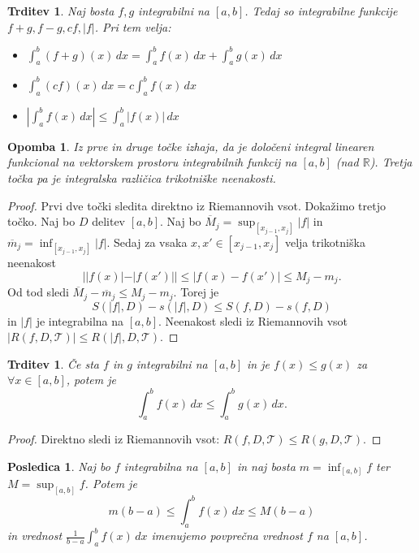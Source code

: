 \documentclass[10pt, a4paper]{article}
\newtheorem{posledica}[izr]{Posledica}
\newtheorem{trditev}[izr]{Trditev}
\newtheorem*{opomba}{Opomba}
\newenvironment{noticeC}{%
  \tcolorbox[%
  notitle,
  empty,
  enhanced,  %
  breakable,
  coltext=black, 
  fontupper=\rmfamily,
  noparskip,
  sharp corners,
  boxrule=-1pt,  %
  frame hidden,
  left=7pt,  %
  right=7pt,
  top=5pt,
  bottom=5pt,
  before skip=2.5ex plus 2pt,
  after skip=2.5ex plus 2pt,
  overlay unbroken and last={%
  },
  ]}
{\endtcolorbox}
\newenvironment{dokaz}%
  {\begin{noticeC}\begin{proof}}%
  {\end{proof}\end{noticeC}}
\newcommand{\R}{\mathbb {R}}
\begin{document}
\begin{trditev}
    Naj bosta $f, g$ integrabilni na $[a, b]$. Tedaj so integrabilne funkcije $f+g, f-g, c f, |f|$.
    Pri tem velja:
    \begin{itemize}
        \item $\int_a ^b (f + g)(x)\,dx = \int_a ^b f(x)\,dx + \int_a ^b g(x)\,dx$
        \item $\int_a ^b (cf)(x)\,dx = c\int_a ^b f(x)\,dx$
        \item $\left|\int_a ^b f(x)\,dx\right| \leq \int_a ^b |f(x)|\,dx$
    \end{itemize}
\end{trditev}

\begin{opomba}
    Iz prve in druge točke izhaja, da je določeni integral linearen funkcional na vektorskem prostoru integrabilnih funkcij na $[a, b]$ (nad $\R$).
    Tretja točka pa je integralska različica trikotniške neenakosti.
\end{opomba}

\begin{dokaz}
    Prvi dve točki sledita direktno iz Riemannovih vsot. Dokažimo tretjo točko.
    Naj bo $D$ delitev $[a, b]$. Naj bo $\overline{M}_j = \sup_{[x_{j-1}, x_{j}]} |f|$ in $\overline{m}_j = \inf_{[x_{j-1}, x_{j}]} |f|$.
    Sedaj za vsaka $x, x' \in [x_{j-1}, x_j]$ velja trikotniška neenakost
    $$||f(x)| - |f(x')|| \leq |f(x) - f(x')| \leq M_j - m_j.$$
    Od tod sledi $\overline{M}_j - \overline{m}_j \leq M_j - m_j$.
    Torej je $$S(|f|, D) - s(|f|, D) \leq S(f, D) - s(f, D)$$
    in $|f|$ je integrabilna na $[a, b]$.
    Neenakost sledi iz Riemannovih vsot $|R(f, D, \mathcal{T})| \leq R(|f|, D, \mathcal{T})$.   
\end{dokaz}

\begin{trditev}
    Če sta $f$ in $g$ integrabilni na $[a, b]$ in je $f(x) \leq g(x)$ za $\forall x \in [a, b]$, potem je 
    $$\int_a ^b f(x)\,dx \leq \int_a ^b g(x)\,dx.$$
\end{trditev}

\begin{dokaz}
    Direktno sledi iz Riemannovih vsot: $R(f, D, \mathcal{T}) \leq R(g, D, \mathcal{T}).$
\end{dokaz}

\begin{posledica}
    Naj bo $f$ integrabilna na $[a, b]$ in naj bosta $m = \inf_{[a, b]} f$ ter $M = \sup_{[a, b]} f$.
    Potem je $$m (b-a) \leq \int_a ^b f(x)\,dx \leq M(b-a)$$ in vrednost $\frac{1}{b - a} \int_a ^b f(x)\,dx$ imenujemo povprečna vrednost $f$ na $[a, b]$.
\end{posledica}
\end{document}
